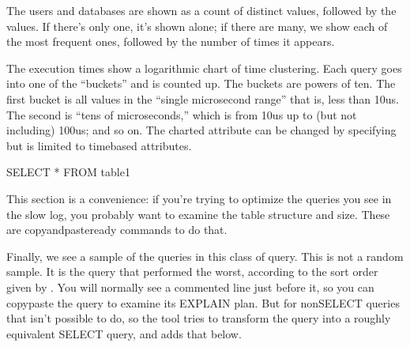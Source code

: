 \documentclass[letterpaper,10pt,english]{sphinxmanual}
\begin{document}
The users and databases are shown as a count of distinct values, followed by the
values.  If there’s only one, it’s shown alone; if there are many, we show each
of the most frequent ones, followed by the number of times it appears.

\begin{sphinxVerbatim}[commandchars=\\\{\}]
\end{sphinxVerbatim}

The execution times show a logarithmic chart of time clustering.  Each query
goes into one of the “buckets” and is counted up.  The buckets are powers of
ten.  The first bucket is all values in the “single microsecond range” \textendash{} that
is, less than 10us.  The second is “tens of microseconds,” which is from 10us
up to (but not including) 100us; and so on.  The charted attribute can be
changed by specifying {\hyperref[\detokenize{mariadb-query-digest:cmdoption-mariadb-query-digest-report-histogram}]{}} but is limited to time\sphinxhyphen{}based
attributes.

\begin{sphinxVerbatim}[commandchars=\\\{\}]
SELECT * FROM table1
\end{sphinxVerbatim}

This section is a convenience: if you’re trying to optimize the queries you see
in the slow log, you probably want to examine the table structure and size.
These are copy\sphinxhyphen{}and\sphinxhyphen{}paste\sphinxhyphen{}ready commands to do that.

Finally, we see a sample of the queries in this class of query.  This is not a
random sample.  It is the query that performed the worst, according to the sort
order given by {\hyperref[\detokenize{mariadb-query-digest:cmdoption-mariadb-query-digest-order-by}]{}}.  You will normally see a commented 
line just before it, so you can copy\sphinxhyphen{}paste the query to examine its EXPLAIN
plan. But for non\sphinxhyphen{}SELECT queries that isn’t possible to do, so the tool tries to
transform the query into a roughly equivalent SELECT query, and adds that below.
\end{document}
